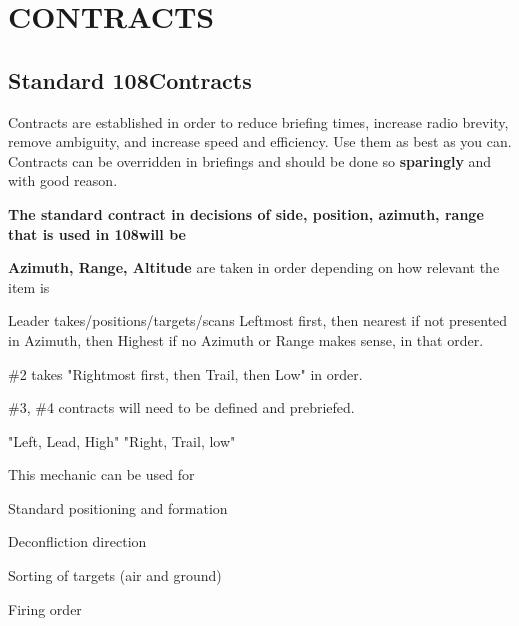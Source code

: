 \section{CONTRACTS}

\subsection{Standard 108\th Contracts}

Contracts are established in order to reduce briefing times, increase radio
brevity, remove ambiguity, and increase speed and efficiency. Use them as best
as you can. Contracts can be overridden in briefings and should be done so
\textbf{sparingly} and with good reason.

\textbf{The standard contract in decisions of side, position, azimuth, range
that is used in 108\th will be}

{
    \begin{subsectionenumerate}
    \setlength{\topsep}{0em}

    \item \textbf{Azimuth, Range, Altitude} are taken in order depending on how
      relevant the item is

    \item Leader takes/positions/targets/scans Leftmost first, then nearest if
      not presented in Azimuth, then Highest if no Azimuth or Range makes
      sense, in that order.

    \item \#2 takes "Rightmost first, then Trail, then Low" in order.

    \item \#3, \#4 contracts will need to be defined and prebriefed.

    \item "Left, Lead, High" "Right, Trail, low"\\[1em]

    \end{subsectionenumerate}

    \vspace{-2em}
    This mechanic can be used for
    \setlength{\parskip}{0em}

    \begin{subsectionenumerate}
      \setcounter{enumi}{5}
      \item Standard positioning and formation

      \item Deconfliction direction

      \item Sorting of targets (air and ground)

      \item Firing order
    \end{subsectionenumerate}
}

